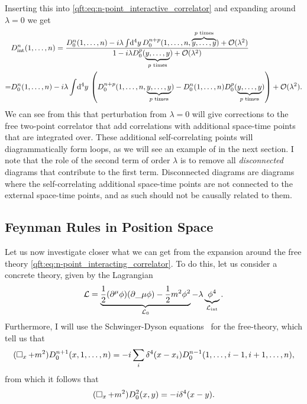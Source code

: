 \documentclass[../main.tex]{subfiles}
\begin{document}
Inserting this into \cref{qft:eq:n-point_interactive_correlator} and expanding around \(\lambda = 0\) we get
\begin{align}
  \label{qft:eq:n-point_interacting_correlator}
  \nonumber
    & D^n_\text{int}(1,\ldots, n) = \frac{D_0^n(1, \ldots, n) - i\lambda \int \!\mathrm{d}^4y\, D_0^{n+p}(1, \ldots, n, \overbrace{y, \ldots, y}^{p\text{ times}}) + \mathcal{O}(\lambda^2)}{1 - i\lambda D_0^p(\underbrace{y, \ldots, y}_{p\text{ times}}) + \mathcal{O}(\lambda^2)} \\
  = & D^n_0(1,\ldots,n) - i\lambda \int \!\mathrm{d}^4y\, \left(D_0^{n+p}(1, \ldots, n, \underbrace{y, \ldots, y}_{p\text{ times}}) - D_0^n(1, \ldots, n) D_0^p(\underbrace{y, \ldots, y}_{p\text{ times}})\right) + \mathcal{O}(\lambda^2).
\end{align}
We can see from this that perturbation from \(\lambda = 0\) will give corrections to the free two-point correlator that add correlations with additional space-time points that are integrated over.
These additional self-correlating points will diagrammatically form loops, as we will see an example of in the next section.
I note that the role of the second term of order \(\lambda\) is to remove all \emph{disconnected} diagrams that contribute to the first term.
Disconnected diagrams are diagrams where the self-correlating additional space-time points are not connected to the external space-time points, and as such should not be causally related to them.


\subsection{Feynman Rules in Position Space}
Let us now investigate closer what we can get from the expansion around the free theory \cref{qft:eq:n-point_interacting_correlator}.
To do this, let us consider a concrete theory, given by the Lagrangian
\begin{equation}
  \label{qft:eq:phi4}
  \L = \underbrace{\frac{1}{2}(\partial\^\mu \phi)(\partial\_\mu\phi) - \frac{1}{2}m^2 \phi^2}_{\L_0} - \lambda \underbrace{\phi^4}_{\L_\text{int}}.
\end{equation}
Furthermore, I will use the Schwinger-Dyson equations~\cite{Schwartz:2014sze} for the free-theory, which tell us that
\begin{equation}
  \label{qft:eq:Schwinger-Dyson_n-point}
  (\operatorname{\Box}_x + m^2) D_0^{n+1}(x, 1, \ldots, n) = -i\sum_{i} \delta^4(x-x_i) D_0^{n-1}(1, \ldots, i-1, i+1, \ldots, n),
\end{equation}
from which it follows that
\begin{equation}
  \label{qft:eq:Schwinger-Dyson_2-point}
  (\operatorname{\Box}_x + m^2) D^2_0(x,y) = -i \delta^4(x-y).
\end{equation}
\end{document}
